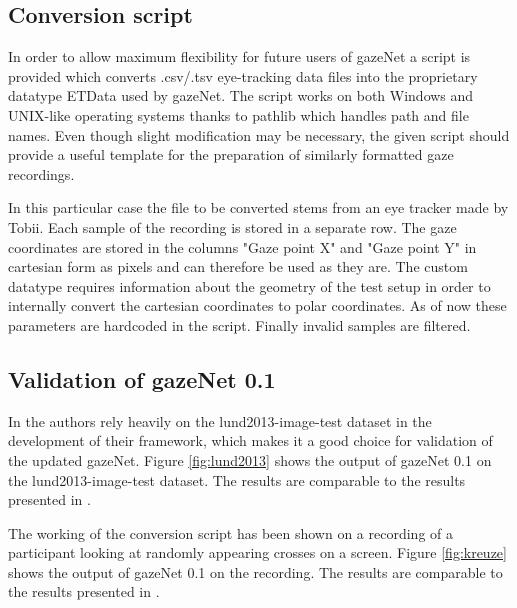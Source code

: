 \documentclass[conference]{IEEEtran}
\begin{document}
\subsection{Conversion script}
In order to allow maximum flexibility for future users of gazeNet a script is provided which converts .csv/.tsv eye-tracking data files into the proprietary datatype ETData used by gazeNet. The script works on both Windows and UNIX-like operating systems thanks to pathlib which handles path and file names. Even though slight modification may be necessary, the given script should provide a useful template for the preparation of similarly formatted gaze recordings.

In this particular case the file to be converted stems from an eye tracker made by Tobii. Each sample of the recording is stored in a separate row. The gaze coordinates are stored in the columns "Gaze point X" and "Gaze point Y" in cartesian form as pixels and can therefore be used as they are. The custom datatype requires information about the geometry of the test setup in order to internally convert the cartesian coordinates to polar coordinates. As of now these parameters are hardcoded in the script. Finally invalid samples are filtered.

\subsection{Validation of gazeNet 0.1}
In \citet{zemblys2018gazeNet} the authors rely heavily on the lund2013-image-test dataset in the development of their framework, which makes it a good choice for validation of the updated gazeNet. Figure \ref{fig:lund2013} shows the output of gazeNet 0.1 on the lund2013-image-test dataset. The results are comparable to the results presented in \citet{zemblys2018gazeNet}. 

The working of the conversion script has been shown on a recording of a participant looking at randomly appearing crosses on a screen. Figure \ref{fig:kreuze} shows the output of gazeNet 0.1 on the recording. The results are comparable to the results presented in \citet{zemblys2018gazeNet}.
\end{document}
